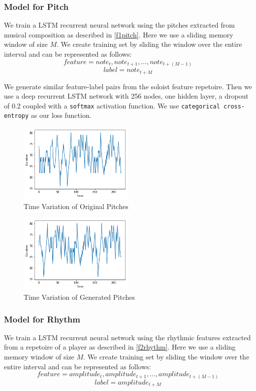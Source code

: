 \documentclass[conference]{IEEEtran}
\begin{document}
\subsubsection{Model for Pitch}
We train a LSTM recurrent neural network using the pitches extracted from musical composition as described in \ref{f1pitch}. Here we use a sliding memory window of size $M$. We create training set by sliding the window over the entire interval and can be represented as follows:
$$feature = {note_{t},note_{t+1},...,note_{t+(M-1)}}$$
$$label = {note_{t+M}}$$

We generate similar feature-label pairs from the soloist feature repetoire. Then we use a deep recurrent LSTM network with 256 nodes, one hidden layer, a dropout of 0.2 coupled with a \texttt{softmax} activation function. We use \texttt{categorical cross-entropy} as our loss function.\\

\begin{figure}[h]
\includegraphics[width=0.5\textwidth]{IEEEtran/notes_o.png}
\caption{Time Variation of Original Pitches}
\label{fig:figure1}
\end{figure}

\begin{figure}[h]
\includegraphics[width=0.5\textwidth]{IEEEtran/notes_g.png}
\caption{Time Variation of Generated Pitches}
\label{fig:figure2}
\end{figure}

\subsubsection{Model for Rhythm}
We train a LSTM recurrent neural network using the rhythmic features extracted from a repetoire of a player as described in \ref{f2rhythm}. Here we use a sliding memory window of size $M$. We create training set by sliding the window over the entire interval and can be represented as follows:
$$feature = {amplitude_{t},amplitude_{t+1},...,amplitude_{t+(M-1)}}$$
$$label = {amplitude_{t+M}}$$
\end{document}
